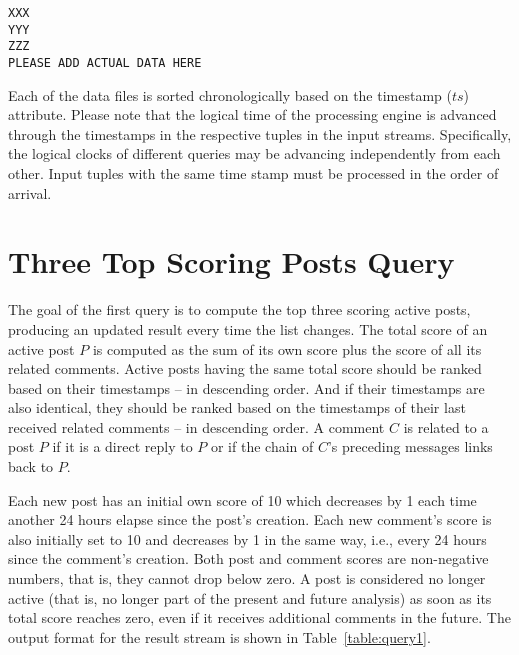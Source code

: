 \documentclass{sig-alternate}
\begin{document}
\lstset{}
\begin{lstlisting}[float=ht,caption={First line from the $comments.dat$ file -- one attribute per line of listing},label={code:like}]
XXX
YYY
ZZZ
PLEASE ADD ACTUAL DATA HERE
\end{lstlisting}

Each of the data files is sorted chronologically based on the timestamp ($ts$) attribute. Please note that the logical time of the processing engine is advanced through the timestamps in the respective tuples in the input streams. Specifically, the logical clocks of different queries may be advancing independently from each other. Input tuples with the same time stamp must be processed in the order of arrival.





\section{Three Top Scoring Posts Query}
\label{sec:query1}
The goal of the first query is to compute the top three scoring active posts, producing an updated result every time the list changes. The total score of an active post $P$ is computed as the sum of its own score plus the score of all its related comments. Active posts having the same total score should be ranked based on their timestamps -- in descending order. And if their timestamps are also identical, they should be ranked based on the timestamps of their last received related comments -- in descending order. A comment $C$ is related to a post $P$ if it is a direct reply to $P$ or if the chain of $C$'s preceding messages links back to $P$.

Each new post has an initial own score of 10 which decreases by 1 each time another 24 hours elapse since the post's creation. Each new comment's score is also initially set to 10 and decreases by 1 in the same way, i.e., every 24 hours since the comment's creation. Both post and comment scores are non-negative numbers, that is, they cannot drop below zero. A post is considered no longer active (that is, no longer part of the present and future analysis) as soon as its total score reaches zero, even if it receives additional comments in the future. The output format for the result stream is shown in Table~\ref{table:query1}. 
\end{document}
